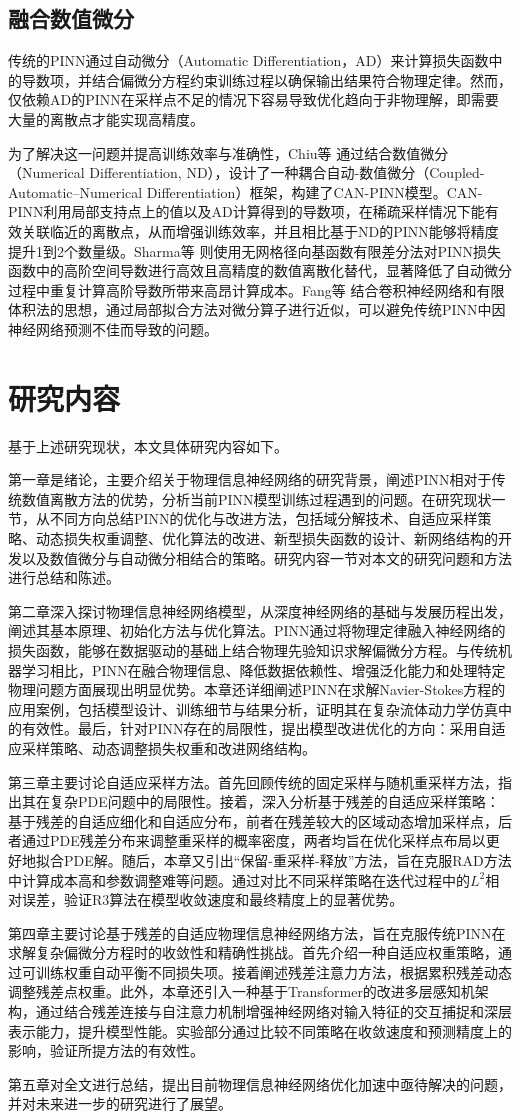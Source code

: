 \subsection{融合数值微分}

传统的PINN通过自动微分（Automatic Differentiation，AD）来计算损失函数中的导数项，并结合偏微分方程约束训练过程以确保输出结果符合物理定律。然而，仅依赖AD的PINN在采样点不足的情况下容易导致优化趋向于非物理解，即需要大量的离散点才能实现高精度。

为了解决这一问题并提高训练效率与准确性，Chiu等 \cite{chiu2022can}通过结合数值微分（Numerical Differentiation, ND），设计了一种耦合自动-数值微分（Coupled-Automatic–Numerical Differentiation）框架，构建了CAN-PINN模型。CAN-PINN利用局部支持点上的值以及AD计算得到的导数项，在稀疏采样情况下能有效关联临近的离散点，从而增强训练效率，并且相比基于ND的PINN能够将精度提升1到2个数量级。Sharma等 \cite{sharma2022accelerated}则使用无网格径向基函数有限差分法对PINN损失函数中的高阶空间导数进行高效且高精度的数值离散化替代，显著降低了自动微分过程中重复计算高阶导数所带来高昂计算成本。Fang等 \cite{fang2021high}结合卷积神经网络和有限体积法的思想，通过局部拟合方法对微分算子进行近似，可以避免传统PINN中因神经网络预测不佳而导致的问题。

\section{研究内容}

基于上述研究现状，本文具体研究内容如下。

第一章是绪论，主要介绍关于物理信息神经网络的研究背景，阐述PINN相对于传统数值离散方法的优势，分析当前PINN模型训练过程遇到的问题。在研究现状一节，从不同方向总结PINN的优化与改进方法，包括域分解技术、自适应采样策略、动态损失权重调整、优化算法的改进、新型损失函数的设计、新网络结构的开发以及数值微分与自动微分相结合的策略。研究内容一节对本文的研究问题和方法进行总结和陈述。

第二章深入探讨物理信息神经网络模型，从深度神经网络的基础与发展历程出发，阐述其基本原理、初始化方法与优化算法。PINN通过将物理定律融入神经网络的损失函数，能够在数据驱动的基础上结合物理先验知识求解偏微分方程。与传统机器学习相比，PINN在融合物理信息、降低数据依赖性、增强泛化能力和处理特定物理问题方面展现出明显优势。本章还详细阐述PINN在求解Navier-Stokes方程的应用案例，包括模型设计、训练细节与结果分析，证明其在复杂流体动力学仿真中的有效性。最后，针对PINN存在的局限性，提出模型改进优化的方向：采用自适应采样策略、动态调整损失权重和改进网络结构。

第三章主要讨论自适应采样方法。首先回顾传统的固定采样与随机重采样方法，指出其在复杂PDE问题中的局限性。接着，深入分析基于残差的自适应采样策略：基于残差的自适应细化和自适应分布，前者在残差较大的区域动态增加采样点，后者通过PDE残差分布来调整重采样的概率密度，两者均旨在优化采样点布局以更好地拟合PDE解。随后，本章又引出“保留-重采样-释放”方法，旨在克服RAD方法中计算成本高和参数调整难等问题。通过对比不同采样策略在迭代过程中的$L^2$相对误差，验证R3算法在模型收敛速度和最终精度上的显著优势。

第四章主要讨论基于残差的自适应物理信息神经网络方法，旨在克服传统PINN在求解复杂偏微分方程时的收敛性和精确性挑战。首先介绍一种自适应权重策略，通过可训练权重自动平衡不同损失项。接着阐述残差注意力方法，根据累积残差动态调整残差点权重。此外，本章还引入一种基于Transformer的改进多层感知机架构，通过结合残差连接与自注意力机制增强神经网络对输入特征的交互捕捉和深层表示能力，提升模型性能。实验部分通过比较不同策略在收敛速度和预测精度上的影响，验证所提方法的有效性。

第五章对全文进行总结，提出目前物理信息神经网络优化加速中亟待解决的问题，并对未来进一步的研究进行了展望。
